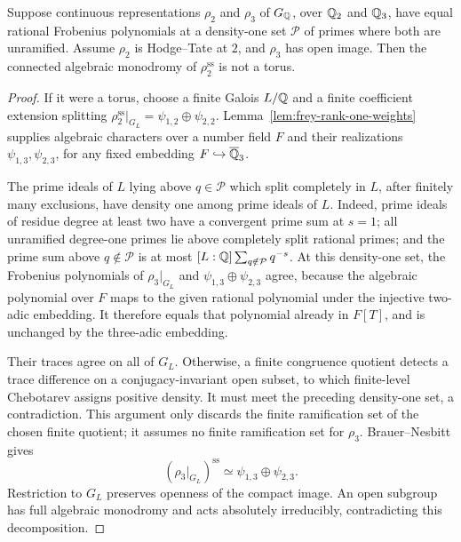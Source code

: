 \begin{lemma}\label{lem:frey-companion-comparison}
Suppose continuous representations \(\rho_2\) and \(\rho_3\) of
\(G_\mathbb Q\), over \(\mathbb Q_2\) and \(\mathbb Q_3\), have equal rational Frobenius
polynomials at a density-one set \(\mathcal P\) of primes where both
are unramified. Assume \(\rho_2\) is Hodge--Tate at \(2\), and
\(\rho_3\) has open image. Then the connected algebraic monodromy
of \(\rho_2^{\mathrm{ss}}\) is not a torus.
\end{lemma}
\begin{proof}
If it were a torus, choose a finite Galois \(L/\mathbb Q\) and a finite
coefficient extension splitting
\(\rho_2^{\mathrm{ss}}|_{G_L}=\psi_{1,2}\oplus\psi_{2,2}\).
Lemma~\ref{lem:frey-rank-one-weights} supplies algebraic characters over a number
field \(F\) and their realizations \(\psi_{1,3},\psi_{2,3}\), for any
fixed embedding \(F\hookrightarrow\overline{\mathbb Q}_3\).

The prime ideals of \(L\) lying above \(q\in\mathcal P\) which split
completely in \(L\), after finitely many exclusions, have density one
among prime ideals of \(L\).
Indeed, prime ideals of residue degree at least two have a convergent
prime sum at \(s=1\); all unramified degree-one primes lie above
completely split rational primes; and the prime sum above
\(q\notin\mathcal P\) is at most \([L:\mathbb Q]\sum_{q\notin\mathcal P}q^{-s}\).
At this density-one set, the Frobenius polynomials of
\(\rho_3|_{G_L}\) and \(\psi_{1,3}\oplus\psi_{2,3}\) agree, because the
algebraic polynomial over \(F\) maps to the given rational polynomial
under the injective two-adic embedding. It therefore equals that
polynomial already in \(F[T]\), and is unchanged by the three-adic embedding.

Their traces agree on all of \(G_L\).
Otherwise, a finite congruence quotient detects a trace difference on
a conjugacy-invariant open subset, to which finite-level Chebotarev
assigns positive density. It must meet the preceding density-one set,
a contradiction.
This argument only discards the finite ramification set of the chosen
finite quotient; it assumes no finite ramification set for \(\rho_3\).
Brauer--Nesbitt gives
\[
 (\rho_3|_{G_L})^{\mathrm{ss}}\simeq\psi_{1,3}\oplus\psi_{2,3}.
\]
Restriction to \(G_L\) preserves openness of the compact image.
An open subgroup has full algebraic monodromy and acts absolutely
irreducibly, contradicting this decomposition.
\end{proof}

